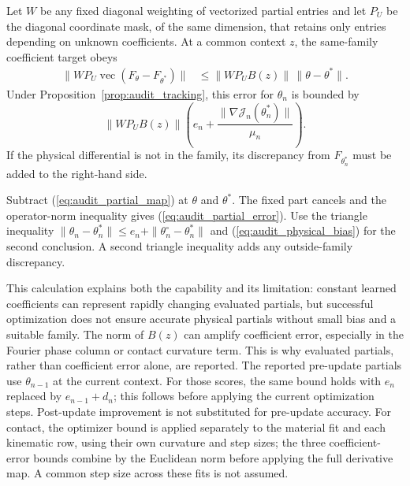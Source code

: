 \documentclass[journal]{IEEEtran}
\begin{document}
\begin{auditproposition}
\label{prop:audit_partial_error}
Let $W$ be any fixed diagonal weighting of vectorized partial entries and
let $P_U$ be the diagonal coordinate mask, of the same dimension,
that retains only entries depending on unknown coefficients.
At a common context $z$, the same-family coefficient target obeys
\begin{align}
 \|WP_U\operatorname{vec}(F_\theta-F_{\theta^*})\|
 &\le\|WP_UB(z)\|\,\|\theta-\theta^*\|.\label{eq:audit_partial_error}
\end{align}
Under Proposition~\ref{prop:audit_tracking}, this error for $\theta_n$
is bounded by
\begin{equation}
 \|WP_UB(z)\|
 \left(e_n+\frac{\|\nabla\mathcal J_n(\theta_n^*)\|}{\mu_n}\right).
 \label{eq:audit_partial_tracking}
\end{equation}
If the physical differential is not in the family, its discrepancy from
$F_{\theta_n^*}$ must be added to the right-hand side.
\end{auditproposition}
\begin{IEEEproof}
Subtract (\ref{eq:audit_partial_map}) at $\theta$ and $\theta^*$.
The fixed part cancels and the operator-norm inequality gives
(\ref{eq:audit_partial_error}). Use the triangle inequality
$\|\theta_n-\theta_n^*\|\le e_n+
\|\theta_n^\circ-\theta_n^*\|$ and
(\ref{eq:audit_physical_bias}) for the second conclusion. A second
triangle inequality adds any outside-family discrepancy.
\end{IEEEproof}
This calculation explains both the capability and its limitation:
constant learned coefficients can represent rapidly changing evaluated
partials, but successful optimization does not ensure accurate physical
partials without small bias and a suitable family. The norm of $B(z)$
can amplify coefficient error, especially in the Fourier phase column
or contact curvature term. This is why evaluated partials, rather than
coefficient error alone, are reported.
The reported pre-update partials use $\theta_{n-1}$ at the current context.
For those scores, the same bound holds with $e_n$ replaced by
$e_{n-1}+d_n$; this follows before applying the current optimization
steps. Post-update improvement is not substituted for pre-update accuracy.
For contact, the optimizer bound is applied separately to the material
fit and each kinematic row, using their own curvature and step sizes;
the three coefficient-error bounds combine by the Euclidean norm before
applying the full derivative map. A common step size across these fits
is not assumed.
\end{document}
